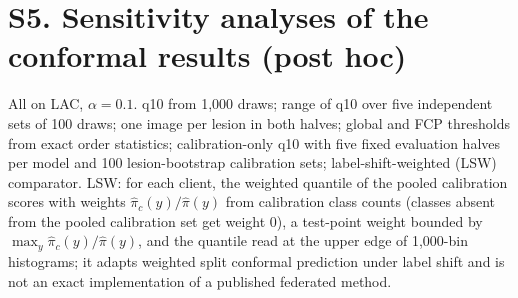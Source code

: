 \documentclass[10pt]{article}
\begin{document}
\section*{S5. Sensitivity analyses of the conformal results (post hoc)}
All on LAC, $\alpha=0.1$. q10 from 1,000 draws; range of q10 over five independent sets of 100 draws; one image per lesion in both halves; global and FCP thresholds from exact order statistics; calibration-only q10 with five fixed evaluation halves per model and 100 lesion-bootstrap calibration sets; label-shift-weighted (LSW) comparator. LSW: for each client, the weighted quantile of the pooled calibration scores with weights $\hat\pi_c(y)/\hat\pi(y)$ from calibration class counts (classes absent from the pooled calibration set get weight 0), a test-point weight bounded by $\max_y \hat\pi_c(y)/\hat\pi(y)$, and the quantile read at the upper edge of 1,000-bin histograms; it adapts weighted split conformal prediction under label shift and is not an exact implementation of a published federated method.
\end{document}
